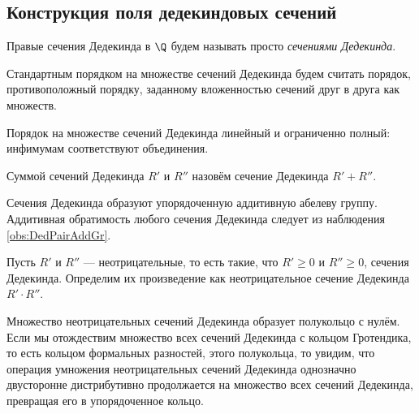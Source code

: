\documentclass[
	extrafontsizes,
	11pt,
	hyphens,
]{memoir}
\begin{document}
\subsection{Конструкция поля дедекиндовых сечений}

\begin{definition}
Правые сечения Дедекинда в \(\Q\) будем называть просто \emph{сечениями Дедекинда}.
\end{definition}

\begin{definition}
Стандартным порядком на множестве сечений Дедекинда будем считать порядок, противоположный порядку, заданному вложенностью сечений друг в друга как множеств.
\end{definition}

\begin{observation}
Порядок на множестве сечений Дедекинда линейный и ограниченно полный: инфимумам соответствуют объединения.
\end{observation}

\begin{definition}
Суммой сечений Дедекинда \(R'\) и \(R''\) назовём сечение Дедекинда \(R' + R''\).
\end{definition}

\begin{observation}
Сечения Дедекинда образуют упорядоченную аддитивную абелеву группу. Аддитивная обратимость любого сечения Дедекинда следует из наблюдения \ref{obs:DedPairAddGr}.
\end{observation}

\begin{definition}
Пусть \(R'\) и \(R''\) --- неотрицательные, то есть такие, что \(R' \geq 0\) и \(R'' \geq 0\), сечения Дедекинда.
Определим их произведение как неотрицательное сечение Дедекинда
\(R' \cdot R''\).
\end{definition}

\begin{observation}
Множество неотрицательных сечений Дедекинда образует полукольцо с нулём. Если мы отождествим множество всех сечений Дедекинда с кольцом Гротендика, то есть кольцом формальных разностей, этого полукольца, то увидим, что операция умножения
неотрицательных сечений Дедекинда
однозначно двусторонне дистрибутивно продолжается на множество всех сечений Дедекинда, превращая его в упорядоченное кольцо.
\end{observation}
\end{document}
